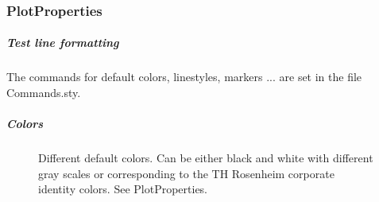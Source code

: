  \subsubsection{PlotProperties}
 \subparagraph{Test line formatting} 			%
 The commands for default colors, linestyles, markers ... are set in the file Commands.sty.
 \subparagraph{Colors} 		%
 \begin{figure}[htb]
 	\centering
 	\caption{Different default colors. Can be either black and white with different gray scales or corresponding to the TH Rosenheim corporate identity colors. See PlotProperties.}
 \end{figure}
